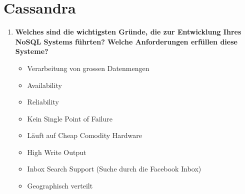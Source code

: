 \documentclass[a4paper,10pt,titlepage=false]{scrreprt}
\begin{document}
\section{Cassandra} %
\label{sec:cassandra}
\begin{enumerate}
  \item \textbf{Welches sind die wichtigsten Gründe, die zur Entwicklung Ihres NoSQL Systems führten? Welche Anforderungen erfüllen diese Systeme?}\\
  \begin{itemize}
    \item Verarbeitung von grossen Datenmengen
\item Availability
\item Reliability   
\item Kein Single Point of Failure
\item Läuft auf Cheap Comodity Hardware
\item High Write Output
\item Inbox Search Support (Suche durch die Facebook Inbox)
\item Geographisch verteilt


\end{itemize}
\end{enumerate}
\end{document}
